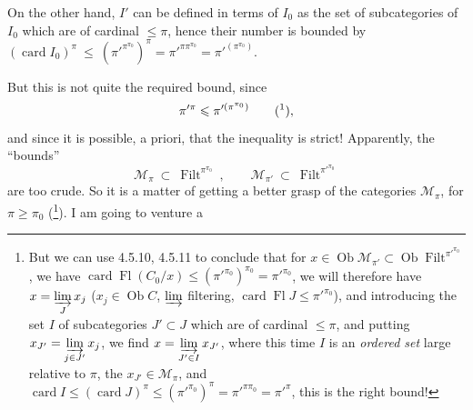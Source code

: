 \documentclass[11pt]{article}
\newcommand{\printedpage}[1]{\marginpar{\footnotesize p.~#1}}
\newcommand{\msp}[1]{\marginpar{\footnotesize [#1]}}
\newcommand{\Filt}{\operatorname{Filt}}
\newcommand{\Ob}{\operatorname{Ob}}
\newcommand{\card}{\operatorname{card}}
\newcommand{\Fl}{\operatorname{Fl}}
\begin{document}
On the other hand, $I'$ can be defined in terms of $I_0$ as the set of subcategories of $I_0$ which are of cardinal $\leqslant \pi$, hence their number is bounded by $(\card I_0)^\pi \ \leqslant \ (\pi'^{\pi^{\pi_0}})^\pi = \pi'^{\pi\pi^{\pi_0}} = \pi'^{(\pi^{\pi_0})}$.

But this is not quite the required bound, since
\[
\pi'^{\pi} \leqslant \pi'^{(\pi^{\pi_0})} \qquad \text{(\footnotemark)},
\]
%
and since it is possible, a priori, that the inequality
\printedpage{38}
\msp{page 125}
is strict! Apparently, the ``bounds''
\[
\mathcal{M}_\pi \ \subset \ \Filt^{\pi^{\pi_0}} \ , \qquad \mathcal{M}_{\pi'} \ \subset \ \Filt^{\pi'^{\pi_0}}
\]
are too crude. So it is a matter of getting a better grasp of the categories $\mathcal{M}_\pi$, for $\pi \geqslant \pi_0$ (\footnote{But we can use 4.5.10, 4.5.11 to conclude that for $x \in \Ob \mathcal{M}_{\pi'} \subset \Ob \Filt^{\pi'^{\pi_0}}$, we have $\card \Fl(C_0/x) \leqslant (\pi'^{\pi_0})^{\pi_0} = \pi'^{\pi_0}$, we will therefore have $x = \varinjlim\limits_{J} x_j$ ($x_j \in \Ob C$, $\varinjlim$ filtering, $\card \Fl J \leqslant \pi'^{\pi_0}$), and introducing the set $I$ of subcategories $J' \subset J$ which are of cardinal $\leqslant \pi$, and putting $x_{J'} = \varinjlim\limits_{j \in J'} x_j$, we find $x = \varinjlim\limits_{J' \in I} x_{J'}$, where this time $I$ is an \textit{ordered set} large relative to $\pi$, the $x_{J'} \in \mathcal{M}_\pi$, and $\card I \leqslant (\card J)^\pi \leqslant (\pi'^{\pi_0})^\pi = \pi'^{\pi\pi_0} = \pi'^{\pi}$, this is the right bound!}). I am going to venture a
\end{document}
